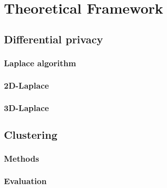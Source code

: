 \chapter{Theoretical Framework}

\section{Differential privacy}
\subsection{Laplace algorithm}
\subsection{2D-Laplace}
\subsection{3D-Laplace}

\section{Clustering}
\subsection{Methods}
\subsection{Evaluation}
